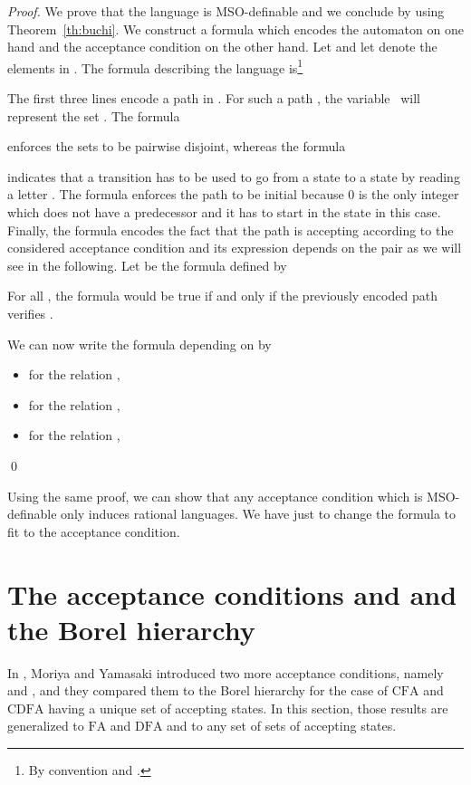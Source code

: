 \documentclass[preprint]{elsarticle}
\newcommand{\FA}{\ensuremath{\mathrm{FA}}\xspace}
\newcommand{\CFA}{\ensuremath{\mathrm{CFA}}\xspace}
\newcommand{\DFA}{\ensuremath{\mathrm{DFA}}\xspace}
\newcommand{\CDFA}{\ensuremath{\mathrm{CDFA}}\xspace}
\begin{document}
\begin{proof}
We prove that the language  is MSO-definable and we conclude by using Theorem~\ref{th:buchi}. We construct a formula  which encodes the automaton on one hand and the acceptance condition on the other hand. Let  and let  denote the elements in .  The formula describing the language is\footnote{By convention  and .}


The first three lines encode a path in .
For such a path ,  the variable~ will represent the set .
The formula

enforces the sets  to be pairwise disjoint, whereas the formula

indicates that a transition  has to be used to go from a state  to a state  by reading a letter . The formula  enforces the path to be initial because 0 is the only integer which does not have a predecessor and it has to start in the state  in this case. Finally, the formula  encodes the fact that the path is accepting according to the considered acceptance condition and its expression depends on the pair  as we will see in the following. Let  be the formula defined by

For all , the formula  would be true if and only if the previously encoded path  verifies .

We can now write the formula  depending on  by
\begin{itemize}
\item
for the relation ,

\item
for the relation ,

\item
for the relation ,
 
\end{itemize}
\qed
\end{proof}

Using the same proof, we can show that any acceptance condition which is MSO-definable only induces rational languages. We have just to change the formula  to fit to the acceptance condition.




\section{The acceptance conditions  and \textbf{} and the Borel hierarchy}

In \cite{Moriya1988},  Moriya and Yamasaki introduced two more acceptance conditions, namely  and
, and they compared them to the Borel hierarchy for the case of \CFA and \CDFA having a
unique set of accepting states. In this section, those results are generalized to \FA and \DFA and to any
set of sets of accepting states.
\end{document}
